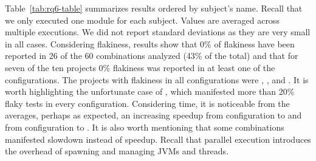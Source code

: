 
Table~\ref{tab:rq6-table} summarizes results ordered by subject's
name. Recall that we only executed one module for each subject.
Values are averaged across multiple executions.  We did not report
standard deviations as they are very small in all cases.  Considering
flakiness, results show that 0\% of flakiness have been reported in 26
of the 60 combinations analyzed (43\% of the total) and that for seven
of the ten projects 0\% flakiness was reported in at least one of the
configurations.  The projects with flakiness in all configurations
were , , and .
It is worth highlighting the unfortunate case of ,
which manifested more than 20\% flaky tests in every configuration.
Considering time, it is noticeable from the averages, perhaps as
expected, an increasing speedup from configuration
\emph{\SeqClassParMeth} to \emph{\ParClassParMeth} and from
configuration \emph{\ForkSeq} to \emph{\ForkParMeth}.  It is also
worth mentioning that some combinations manifested slowdown instead of
speedup.  Recall that parallel execution introduces the overhead of
spawning and managing JVMs and threads.

\begin{center}
\end{center}

